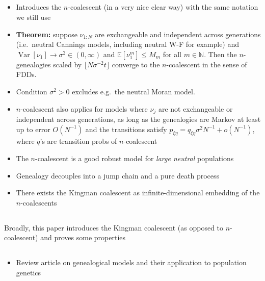 \documentclass{article}
\newcommand{\E}{\mathbb{E}}
\newcommand{\V}{\operatorname{Var}}
\begin{document}
\subsection*{\cite{kingman1982gene}}
\begin{itemize}
\item Introduces the $n$-coalescent (in a very nice clear way) with the same notation we still use
\item \textbf{Theorem:} suppose $\nu_{1:N}$ are exchangeable and independent across generations (i.e.\ neutral Cannings models, including neutral W-F for example) and $\V[\nu_1]\to\sigma^2 \in (0,\infty)$ and $\E[\nu_1^m] \leq M_m$ for all $m\in\mathbb{N}$. Then the $n$-genealogies scaled by $\lfloor N\sigma^{-2}t \rfloor$ converge to the $n$-coalescent in the sense of FDDs.
\item Condition $\sigma^2 >0$ excludes e.g.\ the neutral Moran model.
\item $n$-coalescent also applies for models where $\nu_j$ are not exchangeable or independent across generations, as long as the genealogies are Markov at least up to error $O(N^{-1})$ and the transitions satisfy $p_{\xi\eta} = q_{\xi\eta}\sigma^2 N^{-1} + o(N^{-1})$, where $q$'s are transition probs of $n$-coalescent
\item The $n$-coalescent is a good robust model for \emph{large neutral} populations
\item Genealogy decouples into a jump chain and a pure death process
\item There exists the Kingman coalescent as infinite-dimensional embedding of the $n$-coalescents
\end{itemize}


\subsection*{\cite{kingman1982coal}}
Broadly, this paper introduces the Kingman coalescent (as opposed to $n$-coalescent) and proves some properties


\subsection*{\cite{tavare1984}}
\begin{itemize}
\item Review article on genealogical models and their application to population genetics
\end{itemize}
\end{document}
